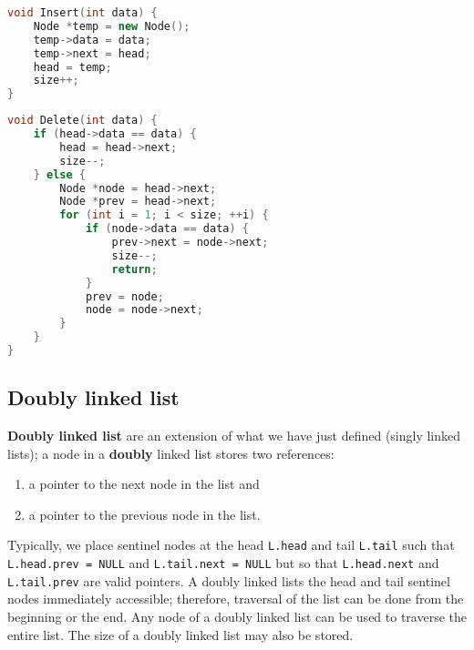 \begin{lstlisting}[float,
                  language = C++,
                  caption = {Insert function for singly linked list in C++.},
                  label = lst:singly_insert]
void Insert(int data) {
    Node *temp = new Node();
    temp->data = data;
    temp->next = head;
    head = temp;
    size++;
}     
\end{lstlisting}

\begin{lstlisting}[float,
                  language = C++,
                  caption = {Delete function for singly linked list in C++.},
                  label = lst:singly_delete]
void Delete(int data) {
    if (head->data == data) {
        head = head->next;
        size--;
    } else {
        Node *node = head->next;
        Node *prev = head->next;
        for (int i = 1; i < size; ++i) {
            if (node->data == data) {
                prev->next = node->next;
                size--;
                return;
            }
            prev = node;
            node = node->next;
        }
    }
}     
\end{lstlisting}

\subsection{Doubly linked list}

\begin{definition}
    \textbf{Doubly linked list} are an extension of what we have just defined (singly linked lists); a node in a \textbf{doubly} linked list stores two references:
    \begin{enumerate}[label=(\roman*)]
        \item a pointer to the next node in the list and
        \item a pointer to the previous node in the list.
    \end{enumerate}
\end{definition}

Typically, we place sentinel nodes at the head \texttt{L.head} and tail \texttt{L.tail} such that \texttt{L.head.prev = NULL} and \texttt{L.tail.next = NULL} but so that \texttt{L.head.next} and \texttt{L.tail.prev} are valid pointers. A doubly linked lists the head and tail sentinel nodes immediately accessible; therefore, traversal of the list can be done from the beginning or the end. Any node of a doubly linked list can be used to traverse the entire list. The size of a doubly linked list may also be stored.

